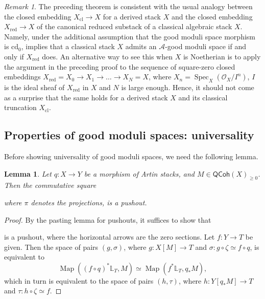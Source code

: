 \documentclass[a4paper,twoside,11pt]{amsart}
\theoremstyle{plain}
\newtheorem{lemma}[theorem]{Lemma}
\theoremstyle{definition}
\theoremstyle{remark}
\newtheorem{remark}[theorem]{Remark}
\numberwithin{equation}{section}
\newcommand{\cd}{\mathrm{cd}}
\newcommand\sA{\mathcal{A}}
\DeclareMathOperator{\Map}{Map}
\renewcommand{\cd}{$\mathrm{cd}_{0}$\xspace}
\DeclareMathOperator{\Spec}{Spec} %
\newcommand{\QCoh}{\mathsf{QCoh}}
\newcommand{\cl}{\mathrm{cl}} %
\newcommand{\oO}{\mathcal{O}}
\renewcommand{\tilde}{\widetilde}
\newcommand{\BL}{{\mathbb{L}}}
\begin{document}
\begin{remark}
    The preceding theorem is consistent with the usual analogy between the closed embedding $X_\cl \to X$ for a derived stack $X$ and the closed embedding $X_{\mathrm{red}} \to X$ of the canonical reduced substack of a classical algebraic stack $X$. Namely, under the additional assumption that the good moduli space morphism is \cd, \cite[Corollary~5.7]{AlperLocalProp} implies that a classical stack $X$ admits an $\sA$-good moduli space if and only if $X_{\mathrm{red}}$ does. An alternative way to see this when $X$ is Noetherian is to apply the argument in the preceding proof to the sequence of square-zero closed embeddings $X_{\mathrm{red}} = X_0 \to X_1 \to \ldots \to X_N = X$, where $X_n = \Spec_X ({\oO_X / I^n})$, $I$ is the ideal sheaf of $X_{\mathrm{red}}$ in $X$ and $N$ is large enough. Hence, it should not come as a surprise that the same holds for a derived stack $X$ and its classical truncation $X_\cl$.
\end{remark}

\subsection{Properties of good moduli spaces: universality} Before showing universality of good moduli spaces, we need the following lemma.

\begin{lemma}
\label{Lem:s0-pushout}
    Let $q \colon X \to Y$ be a morphism of Artin stacks, and $M \in \QCoh(X)_{\geq 0}$. Then the commutative square
    \begin{center}
    \end{center}
    where $\pi$ denotes the projections, is a pushout.
\end{lemma}

\begin{proof}
    By the pasting lemma for pushouts, it suffices to show that
      \begin{center}
    \end{center}  
    is a pushout, where the horizontal arrows are the zero sections. Let $f \colon Y \to T$ be given. Then the space of pairs $(g,\sigma)$, where $g \colon X[M] \to T$ and $\sigma \colon g \circ \zeta \simeq f \circ q$, is equivalent to 
    \[ \Map((f\circ q)^* \BL_T,M) \simeq \Map(f^*\BL_T,q_*M), \]
    which in turn is equivalent to the space of pairs $(h,\tau)$, where $h \colon Y[q_*M] \to T$ and $\tau \colon h \circ \zeta \simeq f$. 
\end{proof}
\end{document}
